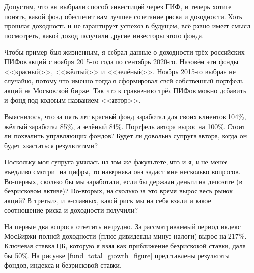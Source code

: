 Допустим, что вы выбрали способ инвестиций через ПИФ, и теперь хотите понять, какой фонд обеспечит вам лучшее сочетание риска и доходности. Хоть прошлая доходность и не гарантирует успехов в будущем, всё равно имеет смысл посмотреть, какой доход получили другие инвесторы этого фонда.

Чтобы пример был жизненным, я собрал данные о доходности трёх российских ПИФов акций с ноября 2015-го года по сентябрь 2020-го. Назовём эти фонды <<красный>>, <<жёлтый>> и <<зелёный>>. Ноябрь 2015-го выбран не случайно, потому что именно тогда я сформировал свой собственный портфель акций на Московской бирже. Так что к сравнению трёх ПИФов можно добавить и фонд под кодовым названием <<автор>>.

Выяснилось, что за пять лет красный фонд заработал для своих клиентов 104\%, жёлтый заработал 85\%, а зелёный 84\%. Портфель автора вырос на 100\%. Стоит ли похвалить управляющих фондов? Будет ли довольна супруга автора, когда он будет хвастаться результатами?

Поскольку моя супруга училась на том же факультете, что и я, и не менее въедливо смотрит на цифры, то наверняка она задаст мне несколько вопросов. Во-первых, сколько бы мы заработали, если бы держали деньги на депозите (в безрисковом активе)? Во-вторых, на сколько за это время вырос весь рынок акций? В третьих, и в-главных, какой риск мы на себя взяли и какое соотношение риска и доходности получили?

На первые два вопроса ответить нетрудно. За рассматриваемый период индекс МосБиржи полной доходности (плюс дивиденды минус налоги) вырос на 217\%. Ключевая ставка ЦБ, которую я взял как приближение безрисковой ставки, дала бы 50\%. На рисунке \ref{fund_total_growth_figure} представлены результаты фондов, индекса и безрисковой ставки.

